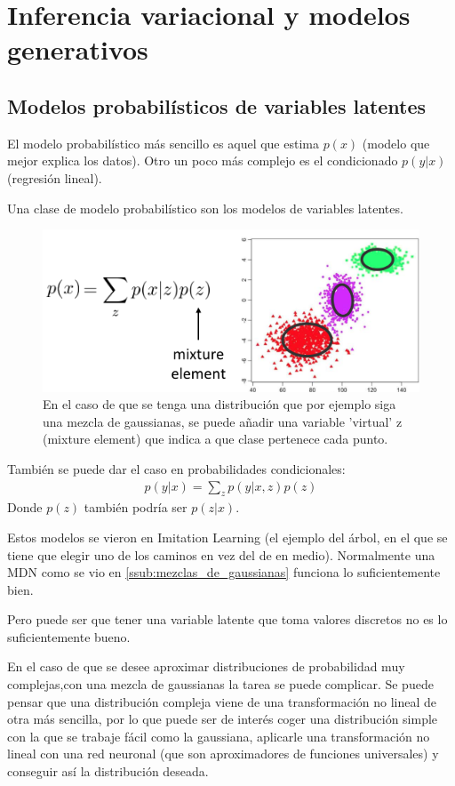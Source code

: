 \chapter{Inferencia variacional y modelos generativos}


\section{Modelos probabilísticos de variables latentes}%
\label{sec:modelos_probabilísticos_de_variables_latentes}

El modelo probabilístico más sencillo es aquel que estima $p(x)$ (modelo que mejor explica los
datos). Otro un poco más complejo es
el condicionado  $p(y|x)$ (regresión lineal).

Una clase de modelo probabilístico son los modelos de variables latentes. 

\begin{figure}[H]
	\centering
	\includegraphics[width=0.5\linewidth]{figures/2020-07-01-123344_537x231_scrot.png}
	\caption{En el caso de que se tenga una distribución que por ejemplo siga una mezcla de
    gaussianas, se puede añadir una variable 'virtual' z (mixture element) que indica a que
clase pertenece cada punto.}
\label{fig:latent_gauss}
\end{figure}

También se puede dar el caso en probabilidades condicionales:
\begin{align}
    p(y|x)=\sum_z p(y|x,z)p(z)
\end{align}
Donde $p(z)$ también podría ser $p(z|x)$.

Estos modelos se vieron en Imitation Learning (el ejemplo del árbol, en el que se tiene que
elegir uno de los caminos en vez del de en medio). Normalmente una MDN como se vio en
\ref{ssub:mezclas_de_gaussianas} funciona lo suficientemente bien.

Pero puede ser que tener una variable latente que toma valores discretos no es lo
suficientemente bueno.

En el caso de que se desee aproximar distribuciones de probabilidad muy complejas,con una mezcla de
gaussianas la tarea se puede complicar. Se puede pensar que una distribución compleja viene de
una transformación no lineal de otra más sencilla, por lo que puede ser de interés coger una
distribución simple con la que se trabaje fácil como la gaussiana, aplicarle una transformación
no lineal con una red neuronal (que son aproximadores de funciones universales) y
conseguir así la distribución deseada.

